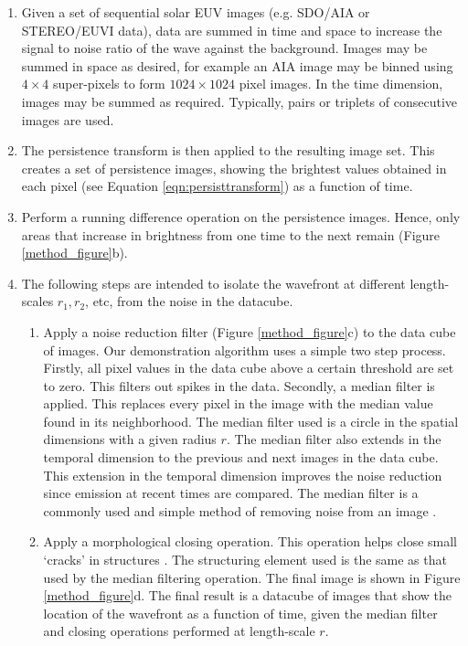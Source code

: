 \begin{enumerate}

\item Given a set of sequential solar EUV images (e.g. SDO/AIA or
  STEREO/EUVI data), data are summed in time and space to increase the
  signal to noise ratio of the wave against the background. Images may
  be summed in space as desired, for example an AIA image may be
  binned using $4\times4$ super-pixels to form $1024\times1024$ pixel
  images. In the time dimension, images may be summed as
  required. Typically, pairs or triplets of consecutive images are
  used.

\item The persistence transform is then applied to the resulting image
  set.  This creates a set of persistence images, showing the
  brightest values obtained in each pixel (see Equation
  \ref{eqn:persisttransform}) as a function of time.

\item Perform a running difference operation on the
  persistence images. Hence, only areas that increase in brightness
  from one time to the next remain (Figure \ref{method_figure}b).

\item 
The following steps are intended to isolate the wavefront at different
length-scales $r_{1}, r_{2}$\textellipsis, etc, from the noise in the
datacube.

\begin{enumerate}

\item Apply a noise reduction filter (Figure \ref{method_figure}c) to
  the data cube of images.  Our demonstration algorithm uses a simple
  two step process.  Firstly, all pixel values in the data cube above
  a certain threshold are set to zero. This filters out spikes in the
  data. Secondly, a median filter is applied.  This replaces every
  pixel in the image with the median value found in its neighborhood.
  The median filter used is a circle in the spatial dimensions with a
  given radius $r$.  The median filter also extends in the temporal
  dimension to the previous and next images in the data cube.  This
  extension in the temporal dimension improves the noise reduction
  since emission at recent times are compared.  The median filter is a
  commonly used and simple method of removing noise from an image
  \citep{2002dip..book.....G}.

\item Apply a morphological closing operation.  This operation helps
  close small ‘cracks’ in structures \citep{2002dip..book.....G}.  The
  structuring element used is the same as that used by the median
  filtering operation. The final image is shown in Figure
  \ref{method_figure}d.  The final result is a datacube of images that
  show the location of the wavefront as a function of time, given the
  median filter and closing operations performed at length-scale $r$.
\end{enumerate}


\end{enumerate}
